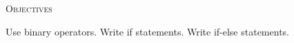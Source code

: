 


\renewcommand\TITLE{Assignment 6}
\usepackage{import}


\topmatter

\textsc{Objectives}
 \begin{myenum}
   \li Use binary operators.
   \li Write if statements.
   \li Write if-else statements.
 \end{myenum}
 



